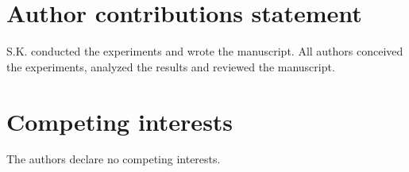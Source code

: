 \section*{Author contributions statement}

S.K. conducted the experiments and wrote the manuscript.
All authors conceived the experiments, analyzed the results and reviewed the manuscript.


\section*{Competing interests}
The authors declare no competing interests.
